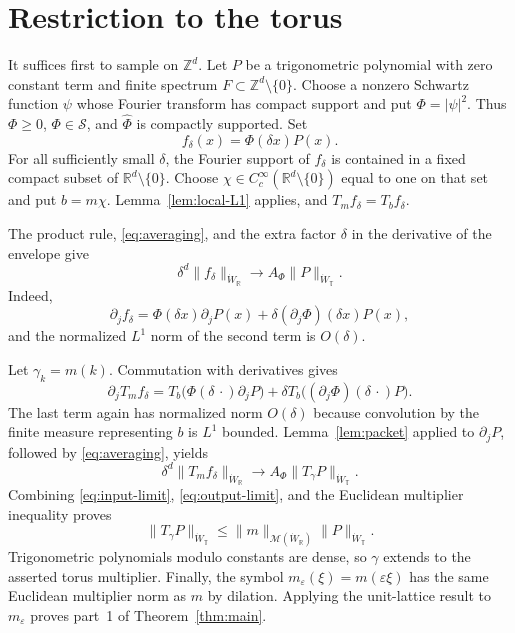 \documentclass[11pt]{article}
\newcommand{\R}{\mathbb R}
\newcommand{\T}{\mathbb T}
\newcommand{\Z}{\mathbb Z}
\newcommand{\M}{\mathcal M}
\newcommand{\eps}{\varepsilon}
\newcommand{\wh}{\widehat}
\begin{document}
\section{Restriction to the torus}

It suffices first to sample on $\Z^d$.  Let $P$ be a trigonometric
polynomial with zero constant term and finite spectrum
$F\subset\Z^d\setminus\{0\}$.  Choose a nonzero Schwartz function $\psi$
whose Fourier transform has compact support and put $\Phi=|\psi|^2$.  Thus
$\Phi\ge0$, $\Phi\in\mathcal S$, and $\wh\Phi$ is compactly supported.
Set
\[
 f_\delta(x)=\Phi(\delta x)P(x).
\]
For all sufficiently small $\delta$, the Fourier support of $f_\delta$ is
contained in a fixed compact subset of $\R^d\setminus\{0\}$.  Choose
$\chi\in C_c^\infty(\R^d\setminus\{0\})$ equal to one on that set and put
$b=m\chi$.  Lemma~\ref{lem:local-L1} applies, and $T_mf_\delta=T_bf_\delta$.

The product rule, \eqref{eq:averaging}, and the extra factor $\delta$ in the
derivative of the envelope give
\begin{equation}\label{eq:input-limit}
 \delta^d\|f_\delta\|_{\dot W_{\R}}
 \longrightarrow A_\Phi\|P\|_{\dot W_{\T}}.
\end{equation}
Indeed,
\[
 \partial_jf_\delta
 =\Phi(\delta x)\partial_jP(x)
   +\delta(\partial_j\Phi)(\delta x)P(x),
\]
and the normalized $L^1$ norm of the second term is $O(\delta)$.

Let $\gamma_k=m(k)$.  Commutation with derivatives gives
\[
 \partial_jT_mf_\delta
 =T_b\big(\Phi(\delta\,\cdot)\partial_jP\big)
  +\delta T_b\big((\partial_j\Phi)(\delta\,\cdot)P\big).
\]
The last term again has normalized norm $O(\delta)$ because convolution by
the finite measure representing $b$ is $L^1$ bounded.  Lemma~\ref{lem:packet}
applied to $\partial_jP$, followed by \eqref{eq:averaging}, yields
\begin{equation}\label{eq:output-limit}
 \delta^d\|T_mf_\delta\|_{\dot W_{\R}}
 \longrightarrow A_\Phi\|T_\gamma P\|_{\dot W_{\T}}.
\end{equation}
Combining \eqref{eq:input-limit}, \eqref{eq:output-limit}, and the Euclidean
multiplier inequality proves
\[
 \|T_\gamma P\|_{\dot W_{\T}}
 \le\|m\|_{\M(\dot W_{\R})}\|P\|_{\dot W_{\T}}.
\]
Trigonometric polynomials modulo constants are dense, so $\gamma$ extends to
the asserted torus multiplier.  Finally, the symbol $m_\eps(\xi)=m(\eps\xi)$
has the same Euclidean multiplier norm as $m$ by dilation.  Applying the
unit-lattice result to $m_\eps$ proves part~1 of
Theorem~\ref{thm:main}.
\end{document}
